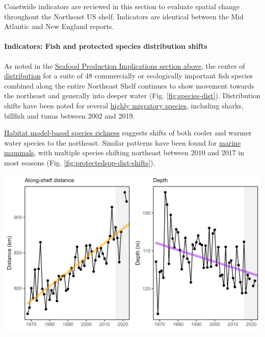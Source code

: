 \documentclass[
  10pt,
]{article}
\let\origfigure\figure
\let\endorigfigure\endfigure
\renewenvironment{figure}[1][2] {
    \expandafter\origfigure\expandafter[H]
} {
    \endorigfigure
}
\begin{document}
Coastwide indicators are reviewed in this section to evaluate spatial change throughout the Northeast US shelf. Indicators are identical between the Mid Atlantic and New England reports.

\paragraph{Indicators: Fish and protected species distribution shifts}\label{indicators-fish-and-protected-species-distribution-shifts}

As noted in the \hyperref[implications]{Seafood Production Implications section above}, the center of \href{https://noaa-edab.github.io/catalog/species_dist.html}{distribution} for a suite of 48 commercially or ecologically important fish species combined along the entire Northeast Shelf continues to show movement towards the northeast and generally into deeper water (Fig. \ref{fig:species-dist}). Distribution shifts have been noted for several \href{https://noaa-edab.github.io/catalog/species_dist.html}{highly migratory species}, including sharks, billfish and tunas between 2002 and 2019.

\href{https://noaa-edab.github.io/catalog/habitat_diversity.html}{Habitat model-based species richness} suggests shifts of both cooler and warmer water species to the northeast. Similar patterns have been found for \href{https://noaa-edab.github.io/catalog/cetacean_dist.html}{marine mammals}, with multiple species shifting northeast between 2010 and 2017 in most seasons (Fig. \ref{fig:protectedspp-dist-shifts}).

\begin{figure}

{\centering \includegraphics[width=6.5in]{images/BothReports/species_dist_BothReports_2025-09-09} 

}

\caption{Aggregate species distribution metrics for species in the Northeast Large Marine Ecosystem: along shelf distance with increasing trend (orange), and depth with decreasing trend indicating deeper water (purple).}\label{fig:species-dist}
\end{figure}
\end{document}

